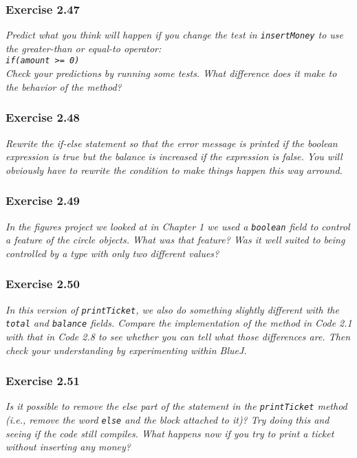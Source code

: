 \subsubsection*{Exercise 2.47}
\textit{Predict what you think will happen if you change the test in 
\lstinline?insertMoney? to use the greater-than or equal-to operator: \\
\lstinline?if(amount >= 0)?\\
Check your predictions by running some tests. What difference does it make to 
the behavior of the method? }

\subsubsection*{Exercise 2.48}
\textit{Rewrite the if-else statement so that the error message is printed if 
the boolean expression is true but the balance is increased if the expression 
is false. You will obviously have to rewrite the condition to make things 
happen this way arround. }

\subsubsection*{Exercise 2.49}
\textit{In the figures project we looked at in Chapter 1 we used a 
\lstinline?boolean? field to control a feature of the circle objects. What was 
that feature? Was it well suited to being controlled by a type with only two 
different values? }

\subsubsection*{Exercise 2.50}
\textit{In this version of \lstinline{printTicket}, we also do something 
slightly different with the \lstinline{total} and \lstinline{balance} fields. 
Compare the implementation of the method in Code 2.1 with that in Code 2.8 to 
see whether you can tell what those differences are. Then check your 
understanding by experimenting within BlueJ. }

\subsubsection*{Exercise 2.51}
\textit{Is it possible to remove the else part of the statement in the 
\lstinline{printTicket} method (i.e., remove the word \lstinline{else} and the 
block attached to it)? Try doing this and seeing if the code still compiles. 
What happens now if you try to print a ticket without inserting any money? }

